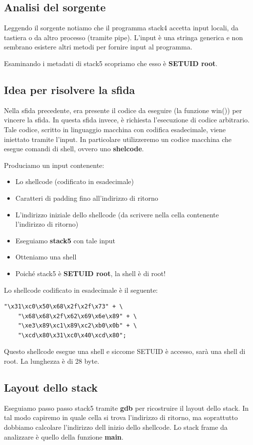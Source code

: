 \subsection{Analisi del sorgente}
Leggendo il sorgente notiamo che il programma stack4 accetta input locali, da tastiera o da altro processo (tramite pipe). L'input è una stringa generica e non sembrano esistere altri metodi per fornire input al programma.

Esaminando i metadati di stack5 scopriamo che esso è \textbf{SETUID root}.

\subsection{Idea per risolvere la sfida}
Nella sfida precedente, era presente il codice da eseguire (la funzione win()) per vincere la sfida. In questa sfida invece, è richiesta l'esecuzione di codice arbitrario. Tale codice, scritto in linguaggio macchina con codifica esadecimale, viene iniettato tramite l'input. In particolare utilizzeremo un codice macchina che esegue comandi di shell, ovvero uno \textbf{shelcode}.

Produciamo un input contenente:
\begin{itemize}
    \item Lo shellcode (codificato in esadecimale)
    \item Caratteri di padding fino all'indirizzo di ritorno
    \item L'indirizzo iniziale dello shellcode (da scrivere nella cella contenente l'indirizzo di ritorno)
    \item Eseguiamo \textbf{stack5} con tale input
    \item Otteniamo una shell
    \item Poiché stack5 è \textbf{SETUID root}, la shell è di root!
\end{itemize}

Lo shellcode codificato in esadecimale è il seguente:
\begin{lstlisting}[style=pythonstyle]
    "\x31\xc0\x50\x68\x2f\x2f\x73" + \
    "\x68\x68\x2f\x62\x69\x6e\x89" + \
    "\xe3\x89\xc1\x89\xc2\xb0\x0b" + \
    "\xcd\x80\x31\xc0\x40\xcd\x80";
\end{lstlisting}
Questo shellcode esegue una shell e siccome SETUID è accesso, sarà una shell di root. La lunghezza è di 28 byte.

\subsection{Layout dello stack}
Eseguiamo passo passo stack5 tramite \textbf{gdb} per ricostruire il layout dello stack. In tal modo capiremo in quale cella si trova l'indirizzo di ritorno, ma soprattutto dobbiamo calcolare l'indirizzo dell inizio dello shellcode. Lo stack frame da analizzare è quello della funzione \textbf{main}.

